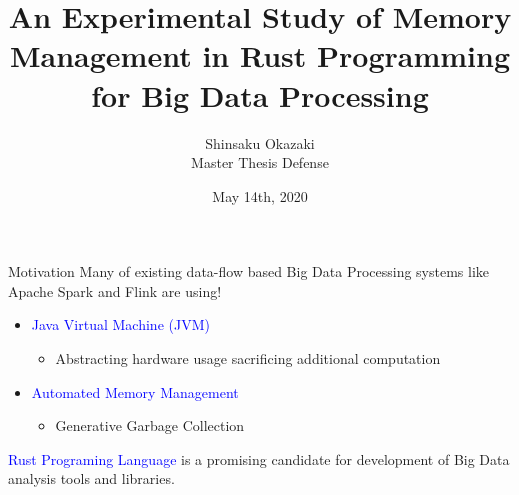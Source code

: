 \documentclass[9pt]{beamer}
\title[]{An Experimental Study of Memory Management in Rust Programming for Big Data Processing}
\date{May 14th, 2020}
\author[Shinsaku Okazaki]{Shinsaku Okazaki\\ Master Thesis Defense}
\institute[]{Supervised by: Kia Teymourian \\ Boston University}
\begin{document}
\maketitle








\begin{frame}[fragile]{Motivation}
Many of existing data-flow based Big Data Processing systems like Apache Spark and Flink are using! 

    \vspace{0.5cm}
    \begin{itemize}
        \item \textcolor{blue}{Java Virtual Machine (JVM)}
        \begin{itemize}
            \item Abstracting hardware usage sacrificing additional computation
        \end{itemize}
        \item \textcolor{blue}{Automated Memory Management}
        \begin{itemize}
            \item Generative Garbage Collection
        \end{itemize}
    \end{itemize}
    \vspace{0.5cm}

\textcolor{blue}{Rust Programing Language} is a promising candidate for development of Big Data analysis tools and libraries.



\end{frame}


\end{document}
